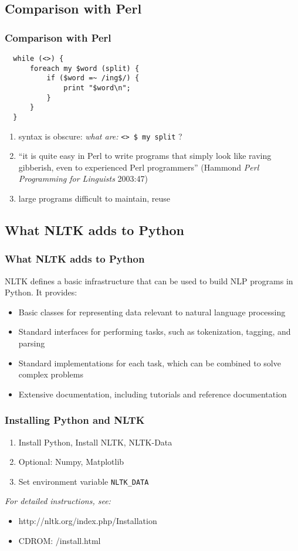 \documentclass{beamer}             %
\begin{document}
\subsection{Comparison with Perl}
\begin{frame}[fragile]
\frametitle{Comparison with Perl}

\begin{verbatim}
  while (<>) {
      foreach my $word (split) {
          if ($word =~ /ing$/) {
              print "$word\n";
          }
      }
  }
\end{verbatim}

\begin{enumerate}
\item syntax is obscure: \textit{what are:} \verb|<> $ my split| ?
\item ``it is quite easy in Perl to write programs that simply
  look like raving gibberish, even to experienced Perl programmers''
  (Hammond \textit{Perl Programming for Linguists} 2003:47)
\item large programs difficult to maintain, reuse
\end{enumerate}
\end{frame}

\subsection{What NLTK adds to Python}
\begin{frame}
\frametitle{What NLTK adds to Python}

NLTK defines a basic infrastructure that can be used to build NLP
programs in Python.  It provides:

\begin{itemize}
\item Basic classes for representing data relevant to natural language
  processing
\item Standard interfaces for performing tasks, such
  as tokenization, tagging, and parsing
\item Standard implementations for each task, which
  can be combined to solve complex problems
\item Extensive documentation, including tutorials
  and reference documentation
\end{itemize}
\end{frame}

\begin{frame}[fragile]
\frametitle{Installing Python and NLTK}
\begin{enumerate}
\item Install Python, Install NLTK, NLTK-Data
\item Optional: Numpy, Matplotlib
\item Set environment variable \verb|NLTK_DATA|
\end{enumerate}

\textit{For detailed instructions, see:}

\begin{itemize}
\item  http://nltk.org/index.php/Installation
\item  CDROM: /install.html
\end{itemize}

\end{frame}
\end{document}
